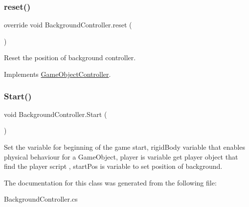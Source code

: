 \hypertarget{class_background_controller_a39841506fc252b3515273a58df8b852f}{}\label{class_background_controller_a39841506fc252b3515273a58df8b852f} 
\subsubsection{\texorpdfstring{reset()}{reset()}}
{\footnotesize\ttfamily override void Background\+Controller.\+reset (\begin{DoxyParamCaption}{ }\end{DoxyParamCaption})\hspace{0.3cm}{\ttfamily [virtual]}}



Reset the position of background controller. 



Implements \hyperlink{class_game_object_controller_a5e57dfd66120a1400e5947f5664a41e4}{Game\+Object\+Controller}.

\hypertarget{class_background_controller_ae65426d342e98cb14dab526c8bd5eadf}{}\label{class_background_controller_ae65426d342e98cb14dab526c8bd5eadf} 
\subsubsection{\texorpdfstring{Start()}{Start()}}
{\footnotesize\ttfamily void Background\+Controller.\+Start (\begin{DoxyParamCaption}{ }\end{DoxyParamCaption})\hspace{0.3cm}{\ttfamily [private]}}



Set the variable for beginning of the game start, rigid\+Body variable that enables physical behaviour for a Game\+Object, player is variable get player object that find the player script , start\+Pos is variable to set position of background. 



The documentation for this class was generated from the following file\+:\begin{DoxyCompactItemize}
\item 
Background\+Controller.\+cs\end{DoxyCompactItemize}
